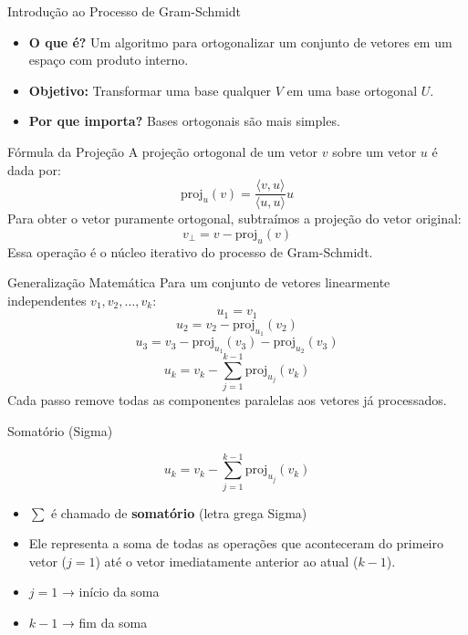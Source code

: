 \documentclass{beamer}
\begin{document}
\begin{frame}{Introdução ao Processo de Gram-Schmidt}
\begin{itemize}
    \item \textbf{O que é?} Um algoritmo para ortogonalizar um conjunto de vetores em um espaço com produto interno.
    \item \textbf{Objetivo:} Transformar uma base qualquer $V$ em uma base ortogonal $U$.
    \item \textbf{Por que importa?} Bases ortogonais são mais simples.
\end{itemize}
\end{frame}
\begin{frame}{Fórmula da Projeção}
A projeção ortogonal de um vetor $v$ sobre um vetor $u$ é dada por:
\[
\text{proj}_{u}(v)= \frac {\langle v, u\rangle}{\langle u, u\rangle}u
\]
Para obter o vetor puramente ortogonal, subtraímos a projeção do vetor original:
\[
v_{\perp}=v-\text{proj}_{u}(v)
\]
Essa operação é o núcleo iterativo do processo de Gram-Schmidt.
\end{frame}
\begin{frame}{Generalização Matemática}
Para um conjunto de vetores linearmente independentes $v_1, v_2, \dots, v_k$:
\[
u_1 = v_1
\]
\[
u_2 = v_2 - \text{proj}_{u_1}(v_2)
\]
\[
u_3 = v_3 - \text{proj}_{u_1}(v_3) - \text{proj}_{u_2}(v_3)
\]
\[
u_k = v_k - \sum_{j=1}^{k-1} \text{proj}_{u_j}(v_k)
\]
Cada passo remove todas as componentes paralelas aos vetores já processados.
\end{frame}
\begin{frame}{Somatório (Sigma)}


\vspace{0.5cm}

\[
u_k = v_k - \sum_{j=1}^{k-1} \mathrm{proj}_{u_j}(v_k)
\]

\vspace{0.5cm}

\begin{itemize}
    \item $\sum$ é chamado de \textbf{somatório} (letra grega Sigma)
    \item Ele representa a soma de todas as operações que aconteceram do primeiro vetor ($j=1$) até o vetor imediatamente anterior ao atual ($k-1$).
\end{itemize}

\vspace{0.5cm}

\begin{itemize}
    \item $j=1$ → início da soma 
    \item $k-1$ → fim da soma 
\end{itemize}

\vspace{0.5cm}

\end{frame}
\end{document}
